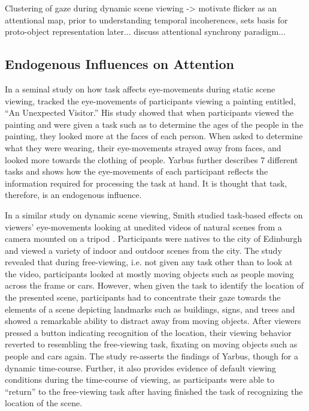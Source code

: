 \documentclass[a4paper,11pt,final]{ThesisStyle}
\begin{document}
Clustering of gaze during dynamic scene viewing -> motivate flicker as an attentional map, prior to understanding temporal incoherences, sets basis for proto-object representation later... discuss attentional synchrony paradigm... 
  	
\subsection{Endogenous Influences on Attention}
\label{sec:endogenous-influences}

In a seminal study on how task affects eye-movements during static scene viewing, \cite{Yarbus1967} tracked the eye-movements of participants viewing a painting entitled, ``An Unexpected Visitor.''  His study showed that when participants viewed the painting and were given a task such as to determine the ages of the people in the painting, they looked more at the faces of each person.  When asked to determine what they were wearing, their eye-movements strayed away from faces, and looked more towards the clothing of people.  Yarbus further describes 7 different tasks and shows how the eye-movements of each participant reflects the information required for processing the task at hand.  It is thought that task, therefore, is an endogenous influence.

In a similar study on dynamic scene viewing, Smith studied task-based effects on viewers' eye-movements looking at unedited videos of natural scenes from a camera mounted on a tripod \cite{Smith2011a}.  Participants were natives to the city of Edinburgh and viewed a variety of indoor and outdoor scenes from the city.  The study revealed that during free-viewing, i.e. not given any task other than to look at the video, participants looked at mostly moving objects such as people moving across the frame or cars.  However, when given the task to identify the location of the presented scene, participants had to concentrate their gaze towards the elements of a scene depicting landmarks such as buildings, signs, and trees and showed a remarkable ability to distract away from moving objects.  After viewers pressed a button indicating recognition of the location, their viewing behavior reverted to resembling the free-viewing task, fixating on moving objects such as people and cars again.  The study re-asserts the findings of Yarbus, though for a dynamic time-course.  Further, it also provides evidence of default viewing conditions during the time-course of viewing, as participants were able to ``return'' to the free-viewing task after having finished the task of recognizing the location of the scene.  
\end{document}
